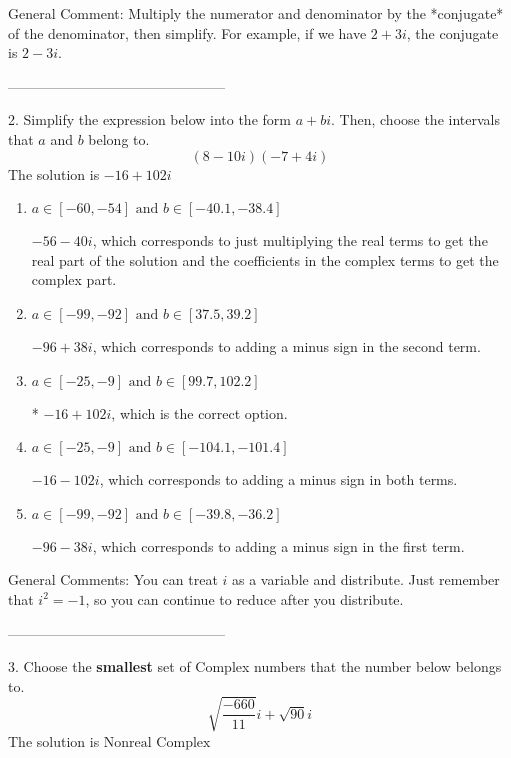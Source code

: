 \documentclass{extbook}[14pt]
\begin{document}
General Comment: Multiply the numerator and denominator by the *conjugate* of the denominator, then simplify. For example, if we have $2+3i$, the conjugate is $2-3i$.

-----------------------------------------------

2. Simplify the expression below into the form $a+bi$. Then, choose the intervals that $a$ and $b$ belong to.
\[ (8  - 10 i)(-7  + 4 i) \] 
The solution is $ -16  + 102 i $ 

\begin{enumerate}[label=\Alph*.] 
\item $ a \in [-60, -54] \text{ and } b \in [-40.1, -38.4] $ 

  $-56  - 40 i$, which corresponds to just multiplying the real terms to get the real part of the solution and the coefficients in the complex terms to get the complex part. 
\item $ a \in [-99, -92] \text{ and } b \in [37.5, 39.2] $ 

  $-96  + 38 i$, which corresponds to adding a minus sign in the second term. 
\item $ a \in [-25, -9] \text{ and } b \in [99.7, 102.2] $ 

 * $-16  + 102 i$, which is the correct option. 
\item $ a \in [-25, -9] \text{ and } b \in [-104.1, -101.4] $ 

  $-16  - 102 i$, which corresponds to adding a minus sign in both terms. 
\item $ a \in [-99, -92] \text{ and } b \in [-39.8, -36.2] $ 

  $-96  - 38 i$, which corresponds to adding a minus sign in the first term. 
\end{enumerate} 
 
General Comments: You can treat $i$ as a variable and distribute. Just remember that $i^2=-1$, so you can continue to reduce after you distribute.

-----------------------------------------------

3. Choose the \textbf{smallest} set of Complex numbers that the number below belongs to.
\[ \sqrt{\frac{-660}{11}} i+\sqrt{90}i \] 
The solution is $ \text{Nonreal Complex} $ 
\end{document}
